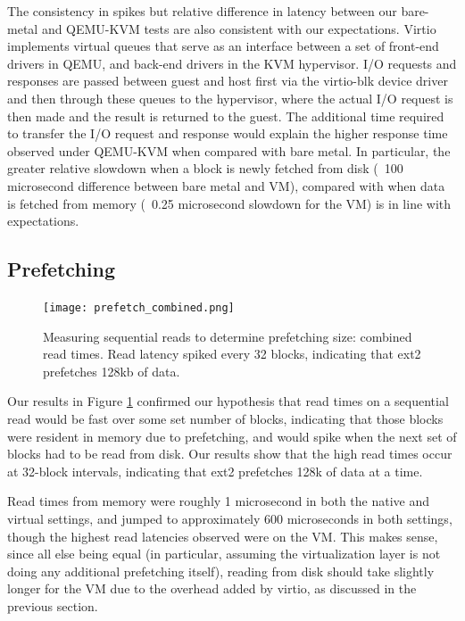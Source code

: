 \documentclass[letterpaper,twocolumn,10pt]{article}
\begin{document}
The consistency in spikes but relative difference in latency between our bare-metal and QEMU-KVM tests are also consistent with our expectations. Virtio implements virtual queues that serve as an interface between a set of front-end drivers in QEMU, and back-end drivers in the KVM hypervisor. I/O requests and responses are passed between guest and host first via the virtio-blk device driver and then through these queues to the hypervisor, where the actual I/O request is then made and the result is returned to the guest. The additional time required to transfer the I/O request and response would explain the higher response time observed under QEMU-KVM when compared with bare metal. In particular, the greater relative slowdown when a block is newly fetched from disk (~100 microsecond difference between bare metal and VM), compared with when data is fetched from memory (~0.25 microsecond slowdown for the VM) is in line with expectations. 

\subsection{Prefetching}
\begin{figure}[!ht]
\texttt{[image: prefetch\_combined.png]}
\caption{Measuring sequential reads to determine prefetching size: combined read times. Read latency spiked every 32 blocks, indicating that ext2 prefetches 128kb of data.}
\label{fig:prefetch_combined}
\end{figure}
Our results in Figure \ref{fig:prefetch_combined} confirmed our hypothesis that read times on a sequential read would be fast over some set number of blocks, indicating that those blocks were resident in memory due to prefetching, and would spike when the next set of blocks had to be read from disk. Our results show that the high read times occur at 32-block intervals, indicating that ext2 prefetches 128k of data at a time. 

Read times from memory were roughly 1 microsecond in both the native and virtual settings, and jumped to approximately 600 microseconds in both settings, though the highest read latencies observed were on the VM. This makes sense, since all else being equal (in particular, assuming the virtualization layer is not doing any additional prefetching itself), reading from disk should take slightly longer for the VM due to the overhead added by virtio, as discussed in the previous section.
\end{document}
